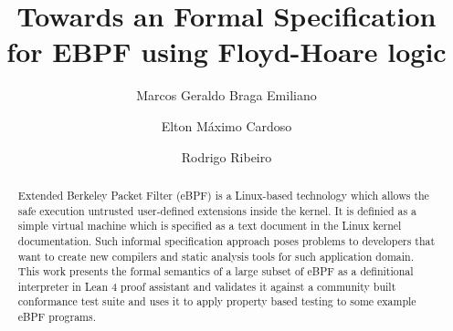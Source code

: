 \documentclass[sigconf]{acmart}
\begin{document}
\title{Towards an Formal Specification for EBPF using Floyd-Hoare logic}

\author{Marcos Geraldo Braga Emiliano}
\author{Elton Máximo Cardoso}
\author{Rodrigo Ribeiro}


\renewcommand{\shortauthors}{Emiliano et al.}
\renewcommand{\shorttitle}{Formal Specification of EBPF using Hoare}

\begin{abstract}
Extended Berkeley Packet Filter (eBPF) is a Linux-based technology
which allows the safe execution untrusted user-defined extensions 
inside the kernel. It is definied as a simple virtual machine which is 
specified as a text document in the Linux kernel documentation. Such 
informal specification approach poses problems to developers that want
to create new compilers and static analysis tools for such application domain.
This work presents the formal semantics of a large subset of eBPF as 
a definitional interpreter in Lean 4 proof assistant and validates it 
against a community built conformance test suite and uses it to apply property
based testing to some example eBPF programs.
\end{abstract}
\end{document}
